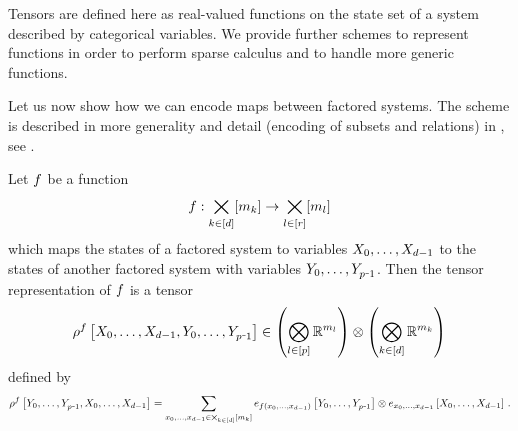 
Tensors are defined here as real-valued functions on the state set of a system described by categorical variables.
We provide further schemes to represent functions in order to perform sparse calculus and to handle more generic functions.



%




Let us now show how we can encode maps between factored systems.
The scheme is described in more generality and detail (encoding of subsets and relations) in , see .

\begin{definition}\label{def:functionRepresentation}
	Let $f$ be a function
		\[ f : \bigtimes_{k\in[d]}[m_{k}] \rightarrow  \bigtimes_{l\in[r]}[m_{l}] \]
	which maps the states of a factored system to variables $X_{0},\ldots,X_{d-1}$ to the states of another factored system with variables $\seccatvariables$.
	Then the tensor representation of $f$ is a tensor
		\[ \rencodingofat{\exformula}{\catvariables,\seccatvariables} \in  \left(\secfacspace\right) \otimes \left(\facspace\right)  \]
	defined by
		\[ \rencodingofat{\exformula}{\seccatvariables,\catvariables}= \sum_{\catindices\in\facstates}
		\onehotmapofat{\exfunction(\catindices)}{\seccatvariables} \otimes  \onehotmapofat{\catindices}{\catvariables} \, . \]
\end{definition}

